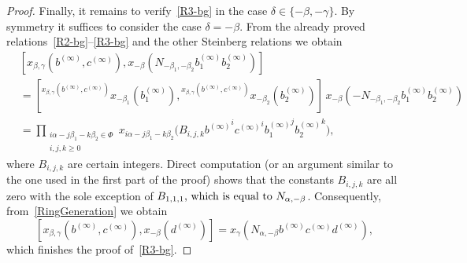 \documentclass[oneside, 11pt]{amsart}
\numberwithin{equation}{section}
\theoremstyle{definition}
\theoremstyle{remark}
\newcommand{\up}[2]{{^{#1}\!{#2}}}
\begin{document}
\begin{proof}
 Finally, it remains to verify~\eqref{R3-bg} in the case $\delta \in \{-\beta, -\gamma\}$.
 By symmetry it suffices to consider the case $\delta = -\beta$.
 From the already proved relations~\eqref{R2-bg}--\eqref{R3-bg} and the other Steinberg relations we obtain
 \begin{align*}
  &[x_{\beta, \gamma}(b^{(\infty)}, c^{(\infty)}),
  x_{-\beta}(N_{-\beta_1, -\beta_2} b_1^{(\infty)} b_2^{(\infty)})] \\
  &= [\up{x_{\beta, \gamma}(b^{(\infty)}, c^{(\infty)})}
   {x_{-\beta_1}(b_1^{(\infty)})},
  \up{x_{\beta, \gamma}(b^{(\infty)}, c^{(\infty)})}
   {x_{-\beta_2}(b_2^{(\infty)})}]\,
  x_{-\beta}(-N_{-\beta_1, -\beta_2} b_1^{(\infty)} b_2^{(\infty)})\\
  &= \prod_{\substack{i\alpha - j\beta_1 - k\beta_2 \in \Phi\\ i, j, k \geq 0}}
  x_{i\alpha - j\beta_1 - k\beta_2}\bigl(B_{i, j, k} {b^{(\infty)}}^i {c^{(\infty)}}^i {b_1^{(\infty)}}^j {b_2^{(\infty)}}^k\bigr),  
 \end{align*}
where $B_{i,j,k}$ are certain integers.
Direct computation (or an argument similar to the one used in the first part of the proof) shows that the constants \(B_{i, j, k}\) are all zero with the sole exception of \(B_{1, 1, 1}$, which is equal to $N_{\alpha, -\beta}\). Consequently, from~\cref{RingGeneration} we obtain
 \[[x_{\beta, \gamma}(b^{(\infty)}, c^{(\infty)}), x_{-\beta}(d^{(\infty)})] = x_\gamma(N_{\alpha, -\beta} b^{(\infty)} c^{(\infty)} d^{(\infty)}),\]
which finishes the proof of~\eqref{R3-bg}.
\end{proof}
\end{document}
